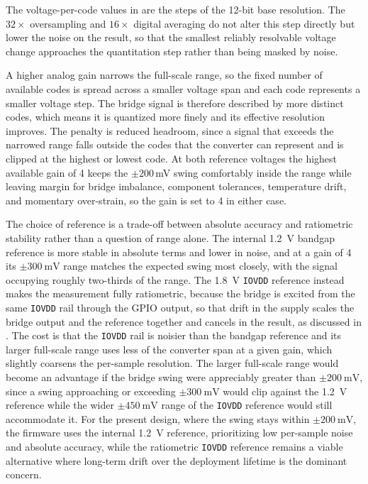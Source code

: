 The voltage-per-code values in  are the steps of the 12-bit base resolution.
The $\num{32}\times$ oversampling and $\num{16}\times$ digital averaging do not alter this step directly but lower the noise on the result, so that the smallest reliably resolvable voltage change approaches the quantitation step rather than being masked by noise.

A higher analog gain narrows the full-scale range, so the fixed number of available codes is spread across a smaller voltage span and each code represents a smaller voltage step.
The bridge signal is therefore described by more distinct codes, which means it is quantized more finely and its effective resolution improves.
The penalty is reduced headroom, since a signal that exceeds the narrowed range falls outside the codes that the converter can represent and is clipped at the highest or lowest code.
At both reference voltages the highest available gain of 4 keeps the $\pm200$\,mV swing comfortably inside the range while leaving margin for bridge imbalance, component tolerances, temperature drift, and momentary over-strain, so the gain is set to 4 in either case.

The choice of reference is a trade-off between absolute accuracy and ratiometric stability rather than a question of range alone.
The internal \SI{1.2}{\volt} bandgap reference is more stable in absolute terms and lower in noise, and at a gain of 4 its $\pm\SI{300}{\milli\volt}$ range matches the expected swing most closely, with the signal occupying roughly two-thirds of the range.
The \SI{1.8}{\volt} \texttt{IOVDD} reference instead makes the measurement fully ratiometric, because the bridge is excited from the same \texttt{IOVDD} rail through the GPIO output, so that drift in the supply scales the bridge output and the reference together and cancels in the result, as discussed in .
The cost is that the \texttt{IOVDD} rail is noisier than the bandgap reference and its larger full-scale range uses less of the converter span at a given gain, which slightly coarsens the per-sample resolution.
The larger full-scale range would become an advantage if the bridge swing were appreciably greater than $\pm\SI{200}{\milli\volt}$, since a swing approaching or exceeding $\pm\SI{300}{\milli\volt}$ would clip against the \SI{1.2}{\volt} reference while the wider $\pm\SI{450}{\milli\volt}$ range of the \texttt{IOVDD} reference would still accommodate it.
For the present design, where the swing stays within $\pm\SI{200}{\milli\volt}$, the firmware uses the internal \SI{1.2}{\volt} reference, prioritizing low per-sample noise and absolute accuracy, while the ratiometric \texttt{IOVDD} reference remains a viable alternative where long-term drift over the deployment lifetime is the dominant concern.

